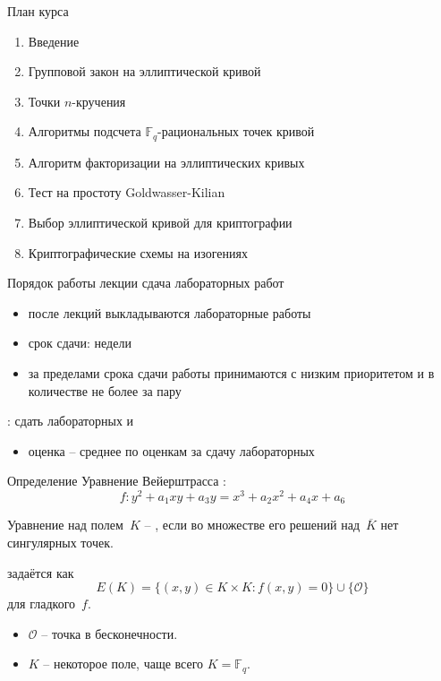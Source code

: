 \documentclass{beamer}
\begin{document}
\begin{frame}{План курса}
\begin{enumerate}
    \item Введение
    \item Групповой закон на эллиптической кривой
    \item Точки $n$-кручения
    \item Алгоритмы подсчета $\mathbb{F}_q$-рациональных точек кривой
    \item Алгоритм факторизации на эллиптических кривых
    \item Тест на простоту Goldwasser-Kilian
    \item Выбор эллиптической кривой для криптографии
    \item Криптографические схемы на изогениях
\end{enumerate}
\end{frame}

\begin{frame}{Порядок работы}
	 лекции \structure{+} сдача лабораторных работ
\vspace{0.5em}
\begin{itemize}
	\item после лекций выкладываются лабораторные работы
	\item срок сдачи:  недели
	\item за пределами срока сдачи работы принимаются с низким приоритетом и в количестве не более  за пару
\end{itemize}
\vspace{0.5em}
: сдать  лабораторных и 
\begin{itemize}
	\item оценка -- среднее по оценкам за сдачу лабораторных
\end{itemize}
\end{frame}

\begin{frame}{Определение}
	Уравнение Вейерштрасса :
	\begin{equation}\label{eq:weierstrassequation}
		f: y^2+a_1xy + a_3y = x^3 + a_2x^2 + a_4x + a_6
	\end{equation}

	Уравнение над полем~$K$ -- , если во множестве его решений над~$\overline{K}$ нет сингулярных точек.
	\vspace{1em}
	
	 задаётся как \[E(K) = \{ (x,y) \in K \times K: f(x,y)=0 \} \cup \{\mathcal{O}\}
	\]
	для гладкого~$f$.
	\begin{itemize}
		\item $\mathcal{O}$ -- точка в бесконечности.
		\item $K$ -- некоторое поле, чаще всего $K = \mathbb{F}_q$.
	\end{itemize}
\end{frame}
\end{document}
